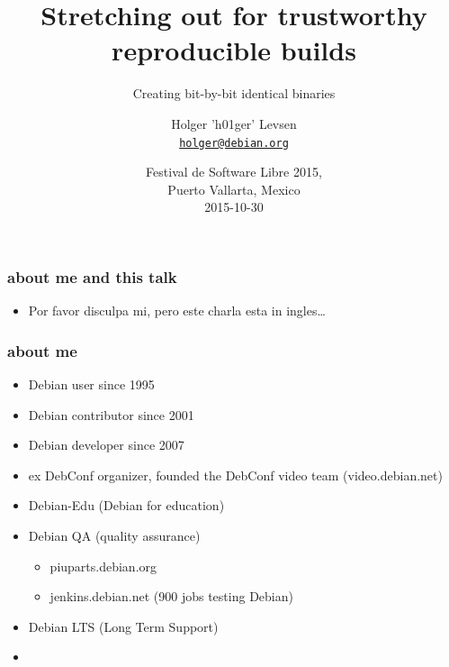 \documentclass[14pt]{beamer}
\title[Reproducible builds]{Stretching out for trustworthy reproducible builds}
\subtitle{Creating bit-by-bit identical binaries}
\author[Holger Levsen]{%
   \texorpdfstring{
        Holger 'h01ger' Levsen\\
        \href{mailto:holger@debian.org}{\texttt{holger@debian.org}}
   }{Reproducible builds team}}
\institute[Debian]{}
\date[FSL.mx 2015]{%
 Festival de Software Libre 2015,\\
 Puerto Vallarta, Mexico\\
 \small
 2015-10-30}
\begin{document}
\begin{frame}
 \titlepage
\end{frame}

\begin{frame}
 \frametitle{about me and this talk}
 \begin{itemize}
  \item Por favor disculpa mi, pero este charla esta in ingles…
\end{itemize}
\end{frame}

\begin{frame}
 \frametitle{about me}

 \begin{itemize}
  \item Debian user since 1995
  \item Debian contributor since 2001
  \item Debian developer since 2007
  \item ex DebConf organizer, founded the DebConf video team (video.debian.net)
  \item Debian-Edu (Debian for education)
  \item Debian QA (quality assurance)
  \begin{itemize}
   \item piuparts.debian.org
   \item jenkins.debian.net (900 jobs testing Debian)
  \end{itemize}
  \item Debian LTS (Long Term Support)
  \item{}
 \end{itemize}
\end{frame}
\end{document}

